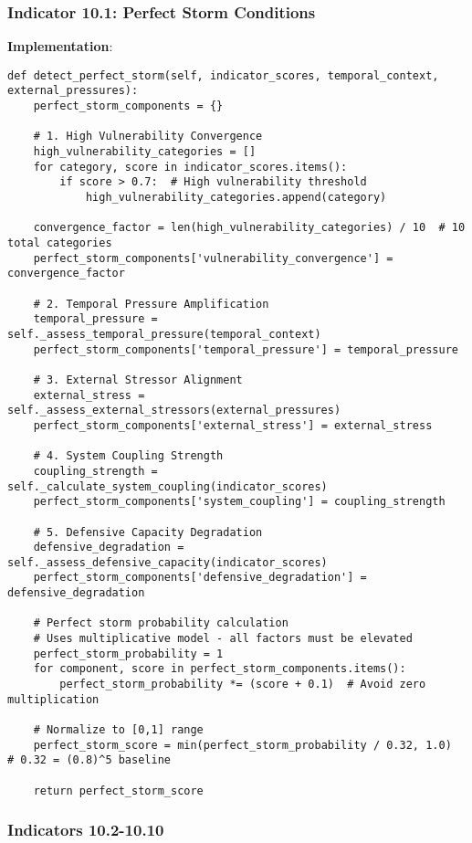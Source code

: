 \documentclass[11pt, onecolumn]{article}
\begin{document}
\subsubsection{Indicator 10.1: Perfect Storm Conditions}

\textbf{Implementation}:

\begin{lstlisting}
def detect_perfect_storm(self, indicator_scores, temporal_context, external_pressures):
    perfect_storm_components = {}
    
    # 1. High Vulnerability Convergence
    high_vulnerability_categories = []
    for category, score in indicator_scores.items():
        if score > 0.7:  # High vulnerability threshold
            high_vulnerability_categories.append(category)
    
    convergence_factor = len(high_vulnerability_categories) / 10  # 10 total categories
    perfect_storm_components['vulnerability_convergence'] = convergence_factor
    
    # 2. Temporal Pressure Amplification
    temporal_pressure = self._assess_temporal_pressure(temporal_context)
    perfect_storm_components['temporal_pressure'] = temporal_pressure
    
    # 3. External Stressor Alignment
    external_stress = self._assess_external_stressors(external_pressures)
    perfect_storm_components['external_stress'] = external_stress
    
    # 4. System Coupling Strength
    coupling_strength = self._calculate_system_coupling(indicator_scores)
    perfect_storm_components['system_coupling'] = coupling_strength
    
    # 5. Defensive Capacity Degradation
    defensive_degradation = self._assess_defensive_capacity(indicator_scores)
    perfect_storm_components['defensive_degradation'] = defensive_degradation
    
    # Perfect storm probability calculation
    # Uses multiplicative model - all factors must be elevated
    perfect_storm_probability = 1
    for component, score in perfect_storm_components.items():
        perfect_storm_probability *= (score + 0.1)  # Avoid zero multiplication
    
    # Normalize to [0,1] range
    perfect_storm_score = min(perfect_storm_probability / 0.32, 1.0)  # 0.32 = (0.8)^5 baseline
    
    return perfect_storm_score
\end{lstlisting}

\subsubsection{Indicators 10.2-10.10}
\end{document}
